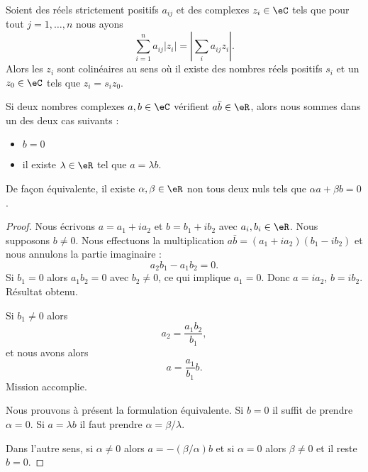 \begin{lemma}       \label{LEMooNIXZooDxfpNM}
    Soient des réels strictement positifs \( a_{ij}\) et des complexes \( z_i\in \eC\) tels que pour tout \( j=1,\ldots, n\) nous ayons
    \begin{equation}
        \sum_{i=1}^na_{ij}| z_i |=| \sum_ia_{ij}z_i |.
    \end{equation}
    Alors les \( z_i\) sont colinéaires au sens où il existe des nombres réels positifs \( s_i\) et un \( z_0\in \eC\) tels que \( z_i=s_iz_0\).
\end{lemma}

\begin{lemma}       \label{LEMooXJBJooFDmhnV}
	Si deux nombres complexes \( a,b\in \eC\) vérifient \( a\bar b\in \eR\), alors nous sommes dans un des deux cas suivants :
	\begin{itemize}
		\item \( b=0\)
		\item il existe \( \lambda\in \eR\) tel que \( a=\lambda b\).
	\end{itemize}
	De façon équivalente, il existe \( \alpha,\beta\in \eR\) non tous deux nuls tels que \( \alpha a+\beta b=0\).
\end{lemma}

\begin{proof}
	Nous écrivons \( a=a_1+ia_2\) et \( b=b_1+ib_2\) avec \( a_i,b_i\in \eR\). Nous supposons \( b\neq 0\). Nous effectuons la multiplication \( a\bar b=(a_1+ia_2)(b_1-ib_2)\) et nous annulons la partie imaginaire :
	\begin{equation}
		a_2b_1-a_1b_2=0.
	\end{equation}
	Si \( b_1=0\) alors \( a_1b_2=0\) avec \( b_2\neq 0\), ce qui implique \( a_1=0\). Donc \( a=ia_2\), \( b=ib_2\). Résultat obtenu.

	Si \( b_1\neq 0\) alors
	\begin{equation}
		a_2=\frac{ a_1b_2 }{ b_1 },
	\end{equation}
	et nous avons alors
	\begin{equation}
		a=\frac{ a_1 }{ b_1 }b.
	\end{equation}
	Mission accomplie.

	Nous prouvons à présent la formulation équivalente. Si \( b=0\) il suffit de prendre \( \alpha=0\). Si \( a=\lambda b\) il faut prendre \( \alpha=\beta/\lambda\).

	Dans l'autre sens, si \( \alpha\neq 0\) alors \( a=-(\beta/\alpha)b\) et si \( \alpha=0\) alors \( \beta\neq 0\) et il reste \( b=0\).
\end{proof}

